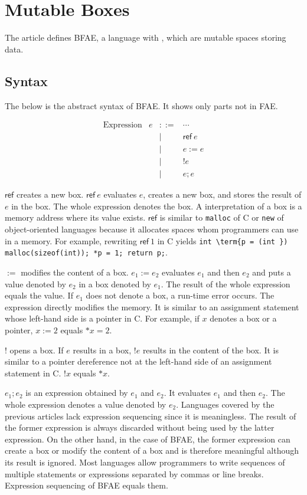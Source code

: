 \setchapterpreamble[u]{\margintoc}
\chapter{Mutable Boxes}

The article defines BFAE, a language with , which are mutable spaces
storing data.

\section{Syntax
}

The below is the abstract syntax of BFAE. It shows only parts not in FAE.

\[
\begin{array}{lrcl}
\text{Expression} & e & ::= & \cdots \\
&& | & \textsf{ref}\ e \\
&& | & e:=e \\
&& | & !e \\
&& | & e;e
\end{array}
\]

\(\textsf{ref}\) creates a new box. \(\textsf{ref}\ e\) evaluates \(e\), creates
a new box, and stores the result of \(e\) in the box. The whole expression
denotes the box. A  interpretation of a box is a memory address
where its value exists. \(\textsf{ref}\) is similar to \verb!malloc! of C or
\verb!new! of object-oriented languages because it allocates spaces whom
programmers can use in a memory. For example, rewriting \(\textsf{ref}\ 1\) in C
yields \verb!int \term{p = (int }) malloc(sizeof(int)); *p = 1; return p;!.

\(:=\) modifies the content of a box. \(e_1:=e_2\) evaluates \(e_1\) and then
\(e_2\) and puts a value denoted by \(e_2\) in a box denoted by \(e_1\). The
result of the whole expression equals the value. If \(e_1\) does not denote a
box, a run-time error occurs. The expression directly modifies the memory. It is
similar to an assignment statement whose left-hand side is a pointer
 in C. For example, if \(x\) denotes a box or a pointer,
\(x:=2\) equals \(*x=2\).

\(!\) opens a box. If \(e\) results in a box, \(!e\) results in the content of
the box. It is similar to a pointer dereference not at the left-hand side of an
assignment statement in C. \(!x\) equals \(*x\).

\(e_1;e_2\) is an expression obtained by  \(e_1\) and \(e_2\).
It evaluates \(e_1\) and then \(e_2\). The whole expression denotes a value
denoted by \(e_2\). Languages covered by the previous articles lack expression
sequencing since it is meaningless. The result of the former expression is always
discarded without being used by the latter expression. On the other hand, in the
case of BFAE, the former expression can create a box or modify the content of a
box and is therefore meaningful although its result is ignored. Most languages
allow programmers to write sequences of multiple statements or expressions
separated by commas or line breaks. Expression sequencing of BFAE equals them.

